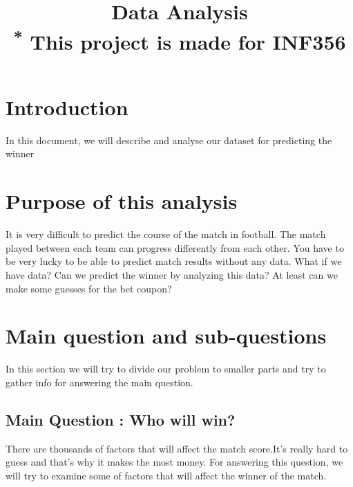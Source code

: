 \documentclass[conference]{IEEEtran}
\begin{document}
\title{Data Analysis\\
{\footnotesize \textsuperscript{*} This project is made for INF356}
}

\author{

}

\maketitle



\section{Introduction}
In this document, we will describe and analyse our dataset for predicting the winner

\section{Purpose of this analysis}

It is very difficult to predict the course of the match in football. The match played between each team can progress differently from each other. You have to be very lucky to be able to predict match results without any data. What if we have data? Can we predict the winner by analyzing this data? At least can we make some guesses for the bet coupon?

\section{Main question and sub-questions}
In this section we will try to divide our problem to smaller parts and try to gather info for answering the main question.


\subsection{Main Question : Who will win?}\label{AA}
There are thousands of factors that will affect the match score.It's really hard to guess and that's why it makes the most money. For answering this question,
we will try to examine some of factors that will affect the winner of the match.
\end{document}
